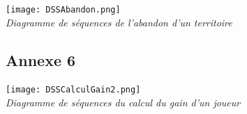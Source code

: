 \documentclass[a4paper, 11pt]{article}
\begin{document}
\begin{appendix}
		\begin{center}
		\vspace*{3cm}
			\texttt{[image: DSSAbandon.png]}\\
			\emph{Diagramme de séquences de l'abandon d'un territoire}
		\end{center}
		
		\newpage


		\subsection*{Annexe 6}
		
		\begin{center}
			\texttt{[image: DSSCalculGain2.png]}\\
			\emph{Diagramme de séquences du calcul du gain d'un joueur}
		\end{center}

		\newpage

		
	\end{appendix}
		
	\tableofcontents
		
\end{document}
